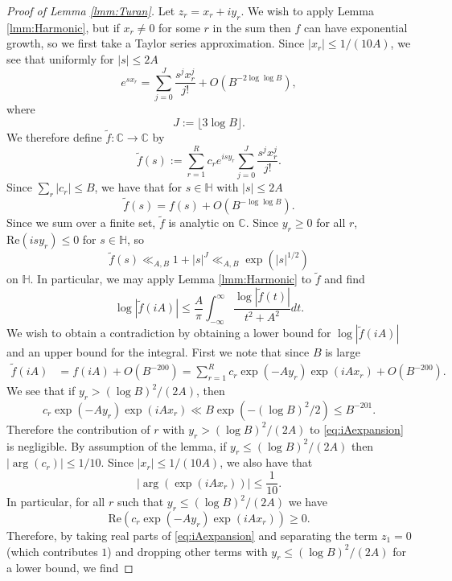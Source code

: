 \documentclass[12pt]{amsart}
\theoremstyle{plain}
\theoremstyle{definition}
\theoremstyle{remark}
\begin{document}
\begin{proof}[Proof of Lemma \ref{lmm:Turan}]
Let $z_r=x_r+iy_r$. We wish to apply Lemma \ref{lmm:Harmonic}, but if $x_r\ne 0$ for some $r$ in the sum then $f$ can have exponential growth, so we first take a Taylor series approximation. Since $|x_r|\le 1/(10A)$, we see that uniformly for $|s|\le 2A$
\[
e^{s x_r}=\sum_{j=0}^J\frac{s^j x_r^j}{j!}+O(B^{-2\log\log{B}}),
\]
where 
\[
J:=\lfloor 3\log{B}\rfloor.
\]
We therefore define $\widetilde{f}:\mathbb{C}\rightarrow\mathbb{C}$ by
\[
\widetilde{f}(s):=\sum_{r=1}^R c_r e^{i s y_r}\sum_{j=0}^J\frac{s^j x_r^j}{j!}.
\]
Since $\sum_{r}|c_r|\le B$, we have that for $s \in \mathbb{H}$ with $|s|\le 2A$
%
\begin{equation}
\widetilde{f}(s)=f(s)+O(B^{-\log\log{B}}).
\label{eq:TildeFApprox}
\end{equation}
%
Since we sum over a finite set, $\widetilde{f}$ is analytic on $\mathbb{C}$. Since $y_r\ge 0$ for all $r$, $\text{Re}(isy_r)\le 0$ for $s\in \mathbb{H}$, so
%
\begin{equation}
\widetilde{f}(s)\ll_{A,B} 1+ |s|^J\ll_{A,B} \exp(|s|^{1/2})
\label{eq:TildeFGrowth}
\end{equation}
%
 on $\mathbb{H}$. In particular, we may apply Lemma \ref{lmm:Harmonic} to $\widetilde{f}$ and find
\begin{equation}
\log|\widetilde{f}(i A)|\le \frac{A}{\pi}\int_{-\infty}^{\infty}\frac{\log{|\widetilde{f}(t)|}}{t^2+A^2}dt.
\label{eq:TildeFHarmonicBound}
\end{equation}
%
We wish to obtain a contradiction by obtaining a lower bound for $\log|\widetilde{f}(iA)|$ and an upper bound for the integral. First we note that since $B$ is large
%
\begin{align}
\widetilde{f}(i A)&=f(i A)+O(B^{-200})=\sum_{r=1}^R c_r \exp(-A y_r)\exp(i A x_r)+O(B^{-200}).
\label{eq:iAexpansion}
\end{align}
%
 We see that if $y_r>(\log{B})^2/(2A)$, then 
\[
c_r \exp(-A y_r)\exp(i A x_r)\ll B\exp(-(\log{B})^2/2)\le B^{-201}.
\]
%
Therefore the contribution of $r$ with $y_r>(\log{B})^2/(2A)$ to \eqref{eq:iAexpansion} is negligible. By assumption of the lemma, if $y_r\le (\log{B})^2/(2A)$ then $|\arg(c_r)|\le 1/10$. Since $|x_r|\le 1/(10A)$, we also have that
%
\[
|\arg(\exp(i A x_r))|\le \frac{1}{10}.
\]
%
In particular, for all $r$ such that $y_r\le (\log{B})^2/(2A)$ we have
%
\[
\text{Re}( c_r \exp(-Ay_r)\exp(i A x_r)  )\ge 0.
\]
%
Therefore, by taking real parts of \eqref{eq:iAexpansion} and separating the term $z_1=0$ (which contributes $1$) and dropping other terms with $y_r\le (\log{B})^2/(2A)$ for a lower bound, we find

\end{proof}
\end{document}
